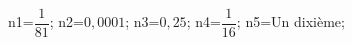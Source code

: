 \documentclass[exercice]{thedocument}%
\begin{document}
%
    \>n1=$\dfrac{1}{81}$;%
    \>n2=$0,0001$;%
    \>n3=$0,25$;%
    \>n4=$\dfrac{1}{16}$;%
    \>n5=Un dixième;%
\end{document}
